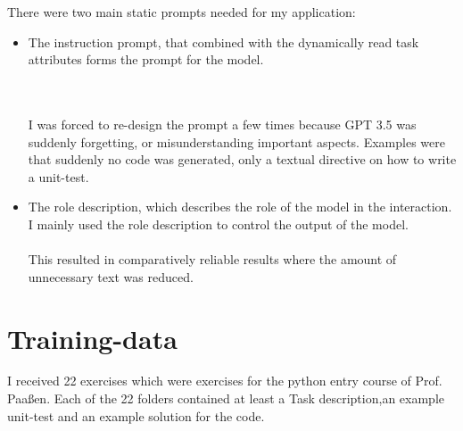 \documentclass[a4paper,11pt,oneside]{memoir}
\begin{document}
There were two main static prompts needed for my application:
\begin{itemize}
\item The instruction prompt, that combined with the dynamically read task attributes forms the prompt for the model. 

\\ \noindent{}\\
I was forced to re-design the prompt a few times because GPT 3.5 was  suddenly forgetting, or misunderstanding important aspects. Examples were that suddenly no code was generated, only a textual directive on how to write a unit-test.

\item The role description, which describes the role of the model in the interaction. I mainly used the role description to control the output of the model.
\\ \noindent{}\\
This resulted in comparatively reliable results where the amount of unnecessary  text was reduced.
 
\end{itemize}

\section{Training-data}
I received 22 exercises which were exercises for the python entry course of Prof. Paaßen. Each of the 22 folders contained at least a Task description,an example unit-test and an example solution for the code. 
\end{document}
